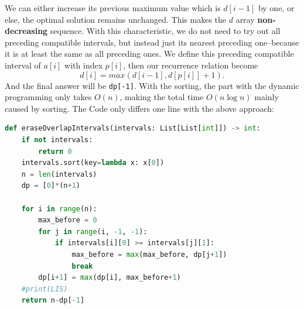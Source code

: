 \documentclass[../main.tex]{subfiles}
\begin{document}
We can either increase its previous maximum value which is $d[i-1]$ by one, or else, the optimal solution remains unchanged. This makes the $d$ array   \textbf{non-decreasing} sequence. With this characteristic, we do not need to try out all preceding compatible intervals, but instead just its nearest preceding one--because it is at least the same as all preceding ones.  We define this preceding compatible interval of $a[i]$ with index $p[i]$, then our recurrence relation become 
\begin{equation}
    d[i] = max(d[i-1], d[p[i]]+1).
\end{equation}
And the final answer will be \texttt{dp[-1]}.
With the sorting, the part with the dynamic programming only takes $O(n)$, making the total time $O(n\log n)$ mainly caused by sorting. The Code only differs one line with the above approach:
\begin{lstlisting}[language=Python]
def eraseOverlapIntervals(intervals: List[List[int]]) -> int:
    if not intervals:
        return 0
    intervals.sort(key=lambda x: x[0])
    n = len(intervals)
    dp = [0]*(n+1) 

    for i in range(n): 
        max_before = 0
        for j in range(i, -1, -1): 
            if intervals[i][0] >= intervals[j][1]:
                max_before = max(max_before, dp[j+1])
                break
        dp[i+1] = max(dp[i], max_before+1)
    #print(LIS)
    return n-dp[-1]
\end{lstlisting}
\end{document}
